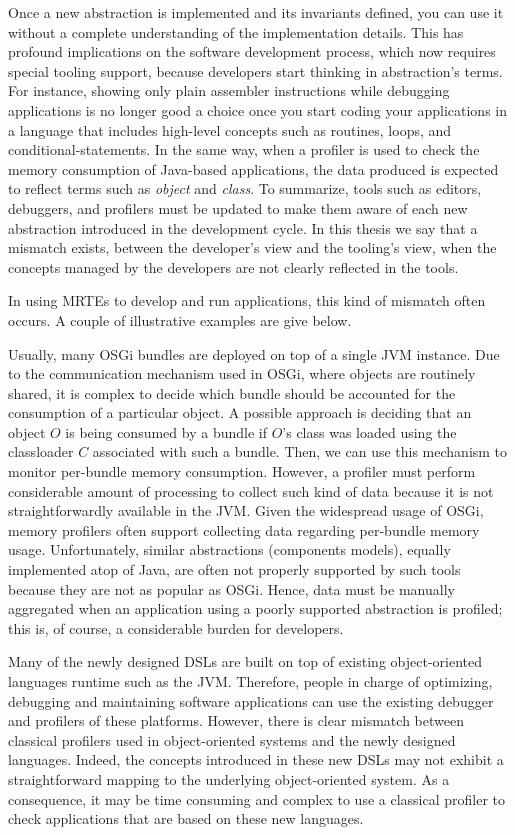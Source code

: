 Once a new abstraction is implemented and its invariants defined, you can use it without a complete understanding of the implementation details.
This has profound implications on the software development process, which now requires special tooling support, because developers start thinking in abstraction's terms.
For instance, showing only plain assembler instructions while debugging applications is no longer good a choice once you start coding your applications in a language that includes high-level concepts such as routines, loops, and conditional-statements.
In the same way, when a profiler is used to check the memory consumption of Java-based applications, the data produced is expected to reflect terms such as \textit{object} and \textit{class}.
To summarize, tools such as editors, debuggers, and profilers must be updated to make them aware of each new abstraction introduced in the development cycle.
In this thesis we say that a mismatch exists, between the developer's view and the tooling's view, when the concepts managed by the developers are not clearly reflected in the tools.

In using MRTEs to develop and run applications, this kind of mismatch often occurs.
A couple of illustrative examples are give below.

Usually, many OSGi bundles are deployed on top of a single JVM instance.
Due to the communication mechanism used in OSGi, where objects are routinely shared, it is complex to decide which bundle should be accounted for the consumption of a particular object.
A possible approach is deciding that an object $O$ is being consumed by a bundle if $O$'s class was loaded using the classloader $C$ associated with such a bundle.
Then, we can use this mechanism to monitor per-bundle memory consumption. 
However, a profiler must perform considerable amount of processing to collect such kind of data because it is not straightforwardly available in the JVM. 
Given the widespread usage of OSGi, memory profilers often support collecting data regarding per-bundle memory usage.
Unfortunately, similar abstractions (components models), equally implemented atop of Java, are often not properly supported by such tools because they are not as popular as OSGi.
Hence, data must be manually aggregated when an application using a poorly supported abstraction is profiled; this is, of course, a considerable burden for developers.

Many of the newly designed DSLs are built on top of existing object-oriented languages runtime such as the JVM. 
Therefore, people in charge of optimizing, debugging and maintaining software applications can use the existing debugger and profilers of these platforms. 
However, there is clear mismatch between classical profilers used in object-oriented systems and the newly designed languages. 
Indeed, the concepts introduced in these new DSLs may not exhibit a straightforward mapping to the underlying object-oriented system.
As a consequence, it may be time consuming and complex to use a classical profiler to check applications that are based on these new languages.


